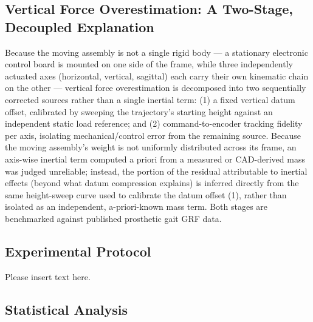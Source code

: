 \documentclass[journal,twocolumn,letterpaper]{IEEEJERM}
\begin{document}
\subsection*{Vertical Force Overestimation: A Two-Stage, Decoupled Explanation}

Because the moving assembly is not a single rigid body --- a stationary
electronic control board is mounted on one side of the frame, while
three independently actuated axes (horizontal, vertical, sagittal) each
carry their own kinematic chain on the other --- vertical force
overestimation is decomposed into two sequentially corrected sources
rather than a single inertial term: (1) a fixed vertical datum offset,
calibrated by sweeping the trajectory's starting height against an
independent static load reference; and (2) command-to-encoder tracking
fidelity per axis, isolating mechanical/control error from the
remaining source. Because the moving assembly's weight is not
uniformly distributed across its frame, an axis-wise inertial term
computed a priori from a measured or CAD-derived mass was judged
unreliable; instead, the portion of the residual attributable to
inertial effects (beyond what datum compression explains) is inferred
directly from the same height-sweep curve used to calibrate the datum
offset (1), rather than isolated as an independent, a-priori-known
mass term. Both stages are benchmarked against published prosthetic
gait GRF data.

\subsection*{Experimental Protocol}
Please insert text here.

\subsection*{Statistical Analysis}
\end{document}
